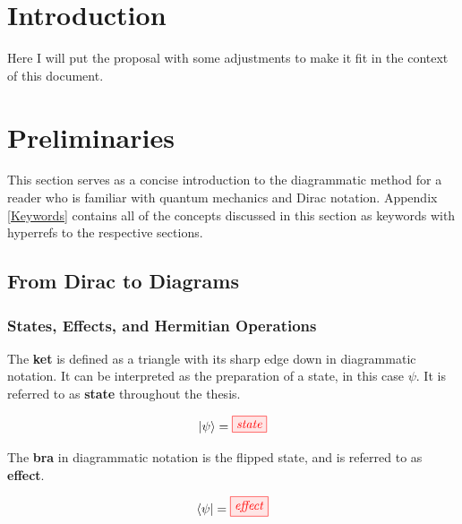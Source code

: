 \documentclass[]{article}
\title{}
\author{}
\begin{document}
\maketitle

\begin{abstract}

\end{abstract}

\section{Introduction}

Here I will put the proposal with some adjustments to make it fit in the context of this document.

\section{Preliminaries}

This section serves as a concise introduction to the diagrammatic method for a reader who is familiar with quantum mechanics and Dirac notation. Appendix \ref{Keywords} contains all of the concepts discussed in this section as keywords with hyperrefs to the respective sections.

\subsection{From Dirac to Diagrams}

\subsubsection{States, Effects, and Hermitian Operations}

\label{braandket}
The \textbf{ket} is defined as a triangle with its sharp edge down in diagrammatic notation. It can be interpreted as the preparation of a state, in this case $\psi$. It is referred to as \textbf{state} throughout the thesis.

\begin{equation}
\label{equation:state}
\ket{\psi} =  \tikzfig{state}
\end{equation}

The \textbf{bra} in diagrammatic notation is the flipped state, and is referred to as \textbf{effect}. 

\begin{equation}
\label{equation:effect}
\bra{\psi} =  \tikzfig{effect}
\end{equation}
\end{document}
